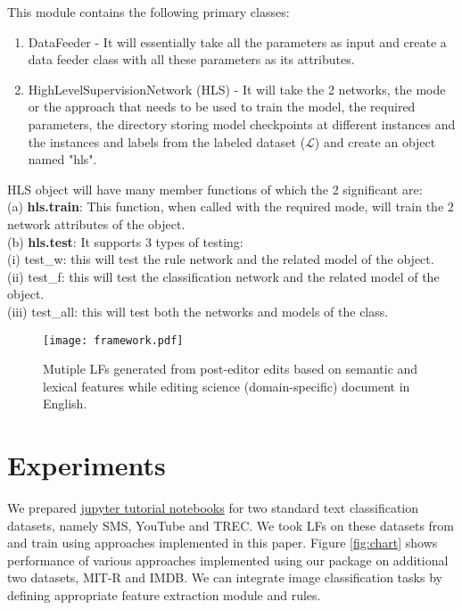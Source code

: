 \documentclass[11pt]{article}
\newcommand{\Lcal}{\mathcal{L}}
\begin{document}
This module contains the following primary classes:
\begin{enumerate}
\item  DataFeeder - It will essentially take all the parameters as input and create a data feeder class with all these parameters as its attributes. 
\item HighLevelSupervisionNetwork (HLS) - It will take the 2 networks, the mode or the approach that needs to be used to train the model, the required parameters, the directory storing model checkpoints at different instances and the instances and labels from the labeled dataset ($\Lcal$) and create an object named "hls".
\end{enumerate}
HLS object will have many member functions of which the 2 significant are:\\
(a) \textbf{hls.train}: This function, when called with the required mode, will train the 2 network attributes of the object.\\
(b) \textbf{hls.test}: It supports 3 types of testing:\\
\indent  (i) test\_w: this will test the rule network and the related model of the object.\\
\indent  (ii) test\_f: this will test the classification network and the related model of the object.\\
\indent  (iii) test\_all: this will test both the networks and models of the class.




\begin{figure*}[t]
    \centering
    \texttt{[image: framework.pdf]}
    \caption{Mutiple LFs generated from post-editor edits based on semantic and lexical features while editing science (domain-specific) document in English.}
    \label{fig:framework}
\end{figure*}
\section{Experiments}

We prepared \href{https://github.com/decile-team/spear/tree/main/notebooks/}{jupyter tutorial notebooks} for two standard text classification datasets, namely SMS, YouTube and TREC. We took LFs on these datasets from \citet{awasthi2020learning} and train using approaches implemented in this paper.  Figure \ref{fig:chart} shows performance of various approaches implemented using our package on additional two datasets, MIT-R and IMDB. We can integrate image classification tasks by defining appropriate feature extraction module and rules.
\end{document}
